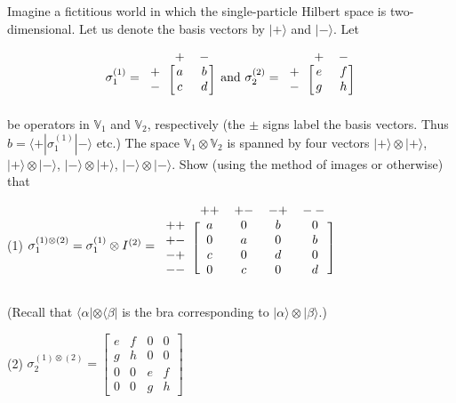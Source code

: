 \documentclass[../principles-of-quantum-mechanics.tex]{subfiles}
\begin{document}
\begin{questions}
		\question Imagine a fictitious world in which the single-particle Hilbert space is two-dimensional. Let us denote the basis vectors by $|+\rangle$ and $|-\rangle$. Let
		
		$$\sigma_1^{(1)} = \begin{blockarray}{ccc}
			 & + & - \\
			\begin{block}{c[cc]}
				+ & a & b \\
				- & c & d \\
			\end{block}
		\end{blockarray}\text{ and }\sigma_2^{(2)} = \begin{blockarray}{ccc}
		& + & - \\
			\begin{block}{c[cc]}
				+ & e & f \\
				- & g & h \\
			\end{block}
		\end{blockarray}$$
		be operators in $\mathbb{V}_1$ and $\mathbb{V}_2$, respectively (the $\pm$ signs label the basis vectors. Thus $b = \langle + |\sigma_1^{(1)}|-\rangle$ etc.) The space $\mathbb{V}_1\otimes\mathbb{V}_2$ is spanned by four vectors $|+\rangle\otimes|+\rangle$, $|+\rangle\otimes|-\rangle$, $|-\rangle\otimes|+\rangle$, $|-\rangle\otimes|-\rangle$. Show (using the method of images or otherwise) that
		
		(1) $\sigma_1^{(1)\otimes(2)} = \sigma_1^{(1)}\otimes I^{(2)} = \begin{blockarray}{ccccc}
			& ++ & +- & -+ & -- \\
			\begin{block}{c[cccc]}
				++ & a & 0 & b & 0 \\
				+- & 0 & a & 0 & b \\
				-+ & c & 0 & d & 0 \\
				-- & 0 & c & 0 & d \\
			\end{block}
		\end{blockarray}$
	
		(Recall that $\langle \alpha|\otimes\langle\beta|$ is the bra corresponding to $|\alpha\rangle\otimes|\beta\rangle$.)
		
		(2) $\sigma_2^{(1)\otimes(2)}=\begin{bmatrix}e & f & 0 & 0 \\ g & h & 0 & 0 \\ 0 & 0 & e & f \\ 0 & 0 & g & h\end{bmatrix}$
		

\end{questions}
\end{document}
